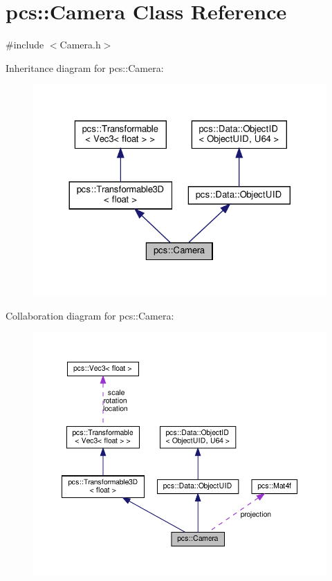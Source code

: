 \hypertarget{classpcs_1_1Camera}{}\section{pcs\+:\+:Camera Class Reference}
\label{classpcs_1_1Camera}


{\ttfamily \#include $<$Camera.\+h$>$}



Inheritance diagram for pcs\+:\+:Camera\+:
\nopagebreak
\begin{figure}[H]
\begin{center}
\leavevmode
\includegraphics[width=324pt]{classpcs_1_1Camera__inherit__graph}
\end{center}
\end{figure}


Collaboration diagram for pcs\+:\+:Camera\+:
\nopagebreak
\begin{figure}[H]
\begin{center}
\leavevmode
\includegraphics[width=350pt]{classpcs_1_1Camera__coll__graph}
\end{center}
\end{figure}

